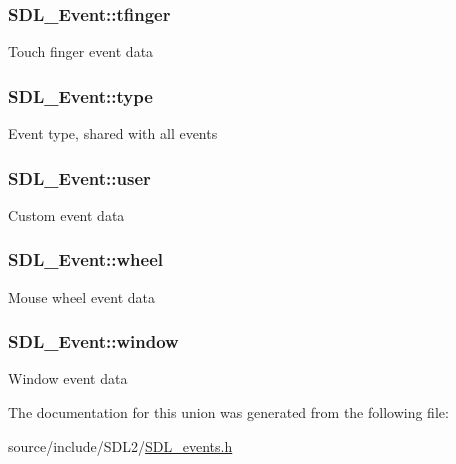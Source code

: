 \subsubsection[{tfinger}]{ S\+D\+L\+\_\+\+Event\+::tfinger}\label{union_s_d_l___event_ab18d7d60794cb056948ffa58541bc3c5}
Touch finger event data \hypertarget{union_s_d_l___event_a237648bec242d2d5835f1a4250ddfa46}{}
\subsubsection[{type}]{ S\+D\+L\+\_\+\+Event\+::type}\label{union_s_d_l___event_a237648bec242d2d5835f1a4250ddfa46}
Event type, shared with all events \hypertarget{union_s_d_l___event_ab7c394e3ce7bf1e4f8d68bc0e9f1b042}{}
\subsubsection[{user}]{ S\+D\+L\+\_\+\+Event\+::user}\label{union_s_d_l___event_ab7c394e3ce7bf1e4f8d68bc0e9f1b042}
Custom event data \hypertarget{union_s_d_l___event_a267d3f550715519ec90a81ccd0e6cbda}{}
\subsubsection[{wheel}]{ S\+D\+L\+\_\+\+Event\+::wheel}\label{union_s_d_l___event_a267d3f550715519ec90a81ccd0e6cbda}
Mouse wheel event data \hypertarget{union_s_d_l___event_a826936b3275406d857bc6654669fae71}{}
\subsubsection[{window}]{ S\+D\+L\+\_\+\+Event\+::window}\label{union_s_d_l___event_a826936b3275406d857bc6654669fae71}
Window event data 

The documentation for this union was generated from the following file\+:\begin{DoxyCompactItemize}
\item 
source/include/\+S\+D\+L2/\hyperlink{_s_d_l__events_8h}{S\+D\+L\+\_\+events.\+h}\end{DoxyCompactItemize}
